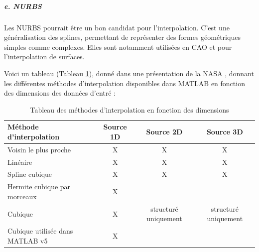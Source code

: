 \subparagraph{e. NURBS}

Les \ac{NURBS} \cite{piegl1995nurbs} pourrait être un bon candidat pour l'interpolation. C'est une généralisation des splines, permettant de représenter des formes géométriques simples comme complexes. Elles sont notamment utilisées en CAO et pour l'interpolation de surfaces. \cite{surface}

Voici un tableau (Tableau \ref{tab:interpolation_methods}), donné dans une présentation de la NASA \cite{nasa}, donnant les différentes méthodes d'interpolation disponibles dans MATLAB en fonction des dimensions des données d'entré :
\begin{table}[ht]
    \centering
    \begin{tabular}{|l|c|c|c|}
    \hline
    \textbf{Méthode d'interpolation} & \textbf{Source 1D} & \textbf{Source 2D} & \textbf{Source 3D} \\ \hline
    Voisin le plus proche & X & X & X \\ \hline
    Linéaire & X & X & X \\ \hline
    Spline cubique & X & X & X \\ \hline
    Hermite cubique par morceaux & X & & \\ \hline
    Cubique & X & structuré uniquement & structuré uniquement \\ \hline %
    Cubique utilisée dans MATLAB v5 & X & & \\ \hline
    \end{tabular}
    \caption{Tableau des méthodes d'interpolation en fonction des dimensions}
    \label{tab:interpolation_methods}
\end{table}


